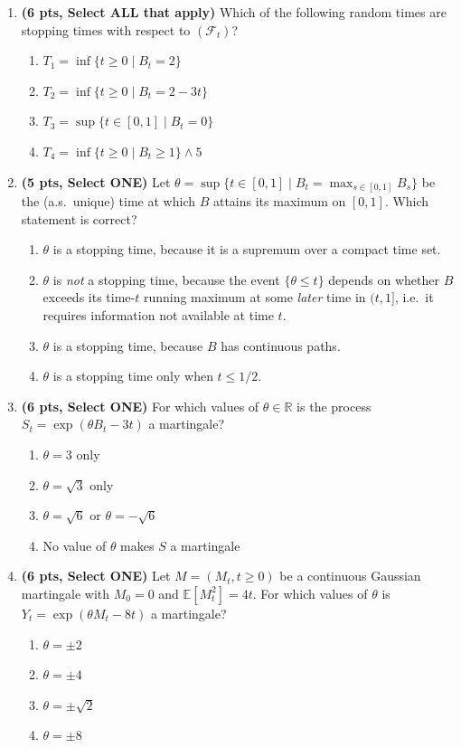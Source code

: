 \documentclass[11pt]{article}
\newcommand{\R}{\mathbb{R}}
\newcommand{\E}{\mathbb{E}}
\begin{document}
\begin{enumerate}

\item[\textbf{Q1.}] \textbf{(6 pts, Select ALL that apply)} Which of the following random times are stopping times with respect to $(\mathcal F_t)$?
\begin{enumerate}
  \item $T_1=\inf\{t\ge 0 \mid B_t=2\}$
  \item $T_2=\inf\{t\ge 0 \mid B_t=2-3t\}$
  \item $T_3=\sup\{t\in[0,1]\mid B_t=0\}$
  \item $T_4=\inf\{t\ge 0 \mid B_t\ge 1\}\wedge 5$
\end{enumerate}

\item[\textbf{Q2.}] \textbf{(5 pts, Select ONE)} Let $\theta=\sup\{t\in[0,1]\mid B_t=\max_{s\in[0,1]}B_s\}$ be the (a.s.\ unique) time at which $B$ attains its maximum on $[0,1]$. Which statement is correct?
\begin{enumerate}
  \item $\theta$ is a stopping time, because it is a supremum over a compact time set.
  \item $\theta$ is \emph{not} a stopping time, because the event $\{\theta\le t\}$ depends on whether $B$ exceeds its time-$t$ running maximum at some \emph{later} time in $(t,1]$, i.e.\ it requires information not available at time $t$.
  \item $\theta$ is a stopping time, because $B$ has continuous paths.
  \item $\theta$ is a stopping time only when $t\le 1/2$.
\end{enumerate}

\item[\textbf{Q3.}] \textbf{(6 pts, Select ONE)} For which values of $\theta\in\R$ is the process $S_t=\exp(\theta B_t-3t)$ a martingale?
\begin{enumerate}
  \item $\theta=3$ only
  \item $\theta=\sqrt3$ only
  \item $\theta=\sqrt6$ or $\theta=-\sqrt6$
  \item No value of $\theta$ makes $S$ a martingale
\end{enumerate}

\item[\textbf{Q4.}] \textbf{(6 pts, Select ONE)} Let $M=(M_t,t\ge0)$ be a continuous Gaussian martingale with $M_0=0$ and $\E[M_t^2]=4t$. For which values of $\theta$ is $Y_t=\exp(\theta M_t-8t)$ a martingale?
\begin{enumerate}
  \item $\theta=\pm2$
  \item $\theta=\pm4$
  \item $\theta=\pm\sqrt2$
  \item $\theta=\pm8$
\end{enumerate}


\end{enumerate}
\end{document}
